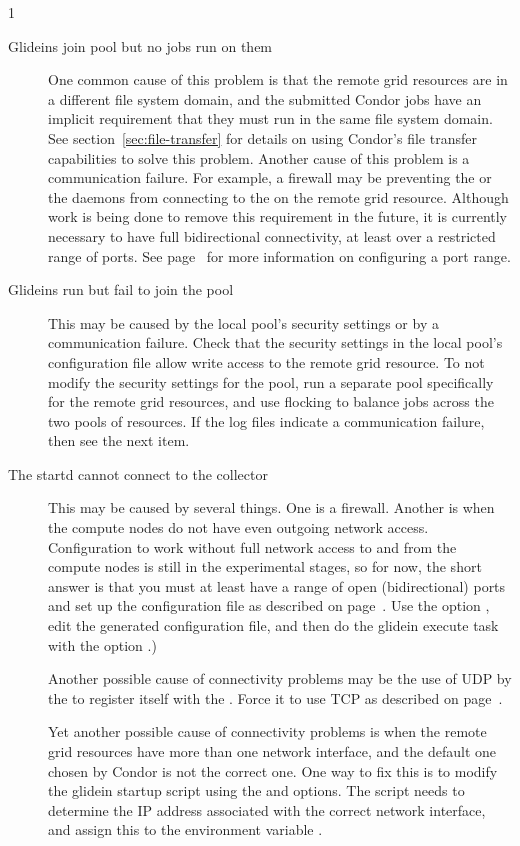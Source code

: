 \begin{ManPage}{\label{man-condor-glidein}}{1}
\begin{description}
\item[Glideins join pool but no jobs run on them] One common
cause of this problem is that the remote grid resources are in a different
file system domain, and the submitted Condor jobs 
have an implicit
requirement that they must run in the same file system domain.  
See
section~\ref{sec:file-transfer} for details on
using Condor's file transfer capabilities to solve this problem.
Another cause of this
problem is a communication failure.  For example, a firewall may be
preventing the  or the  daemons
from connecting to
the  on the remote grid resource.
Although work is being done to remove
this requirement in the future, it is currently necessary to have full
bidirectional connectivity, at least over a restricted range of
ports.  See page~\pageref{param:HighPort} for more information on
configuring a port range.

\item[Glideins run but fail to join the pool] This may be caused by
the local pool's security settings or by a communication failure.  Check
that the security settings in the local pool's configuration file allow
write access to the remote grid resource.  To not modify
the security settings for the pool, run a separate pool
specifically for the remote grid resources,
and use flocking to balance jobs across
the two pools of resources.  If the log files
indicate a communication failure, then see the next item.

\item[The startd cannot connect to the collector] This may be caused
by several things.  One is a firewall.  Another is when the compute
nodes do not have even outgoing network access.  Configuration
to work without full network access to and from the compute nodes is
still in the experimental stages, so for now, the short answer is that
you must at least have a range of open (bidirectional) ports and set
up the configuration file as described on
page~\pageref{param:HighPort}.  Use the option ,
edit the generated configuration file,
and then do the glidein execute task with the option .)

Another possible cause of connectivity problems may be the use of UDP by
the  to register itself with the .
Force it to use TCP as described on
page~\pageref{param:UpdateCollectorWithTcp}.

Yet another possible cause of connectivity problems is when the 
remote grid resources
have more than one network interface, and the default one chosen
by Condor is not the correct one.  One way to fix this is to modify
the glidein startup script using the  and 
options.
The script needs to determine the IP address associated with
the correct network interface, and assign this to the environment
variable .


\end{description}
\end{ManPage}

